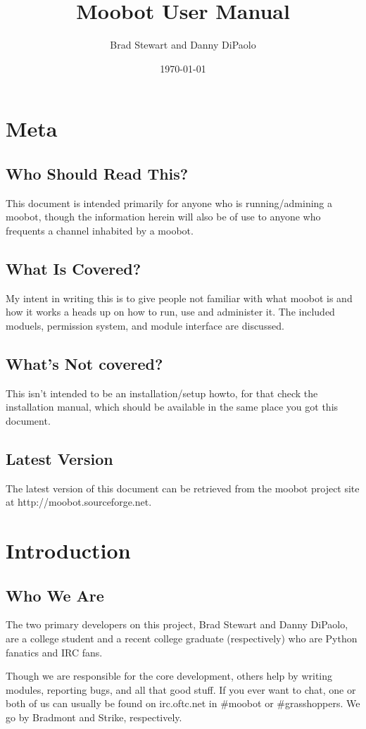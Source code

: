 \documentclass[titlepage]{article}
\author{Brad Stewart and Danny DiPaolo}
\title{Moobot User Manual}
\date{\today}
\begin{document}
	\maketitle
	\tableofcontents
	\newpage

	\section{Meta}
		\subsection{Who Should Read This?}
			This document is intended primarily for anyone who is
			running/admining a moobot, though the information herein will also
			be of use to anyone who frequents a channel inhabited by a moobot.
		\subsection{What Is Covered?}
			My intent in writing this is to give people not familiar with what
			moobot is and how it works a heads up on how to run, use and
			administer it.  The included moduels, permission system, and
			module interface are discussed.
		\subsection{What's Not covered?}
			This isn't intended to be an installation/setup howto, for that
			check the installation manual, which should be available in the
			same place you got this document.
		\subsection{Latest Version}
			The latest version of this document can be retrieved from the
			moobot project site at http://moobot.sourceforge.net.
	\section{Introduction}
		\subsection{Who We Are}
			The two primary developers on this project, Brad Stewart and Danny
			DiPaolo, are a college student and a recent college graduate
			(respectively) who are Python fanatics and IRC fans. 

			Though we are responsible for the core development, others help by
			writing modules, reporting bugs, and all that good stuff.  If you
			ever want to chat, one or both of us can usually be found on
			irc.oftc.net in \#moobot or \#grasshoppers.  We go by Bradmont and
			Strike, respectively.
\end{document}
